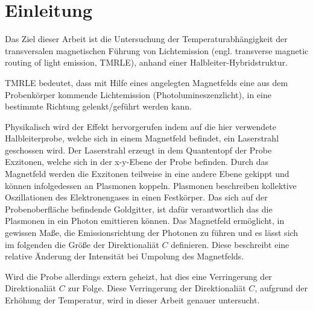 \chapter{Einleitung}
Das Ziel dieser Arbeit ist die Untersuchung der Temperaturabhängigkeit
der transversalen magnetischen Führung von Lichtemission (engl.
transverse magnetic routing of light emission, TMRLE), anhand einer Halbleiter-Hybridstruktur.

TMRLE bedeutet, dass mit Hilfe eines angelegten Magnetfelds eine aus dem 
Probenkörper kommende Lichtemission (Photolumineszenzlicht), in
eine bestimmte Richtung gelenkt/geführt werden kann.

Physikalisch wird der Effekt hervorgerufen indem auf die hier verwendete 
Halbleiterprobe, welche sich in einem Magnetfeld befindet, ein Laserstrahl geschossen wird.
Der Laserstrahl erzeugt in dem Quantentopf der Probe Exzitonen, welche sich in der x-y-Ebene der
Probe befinden. Durch das Magnetfeld werden die Exzitonen teilweise in eine andere Ebene gekippt und
können infolgedessen an Plasmonen koppeln.
Plasmonen beschreiben kollektive Oszillationen des Elektronengases in einen Festkörper. 
Das sich auf der Probenoberfläche befindende Goldgitter, ist dafür verantwortlich 
das die Plasmonen in ein Photon emittieren können.
Das Magnetfeld ermöglicht, in gewissen Maße, die Emissionsrichtung der Photonen 
zu führen und es lässt sich im folgenden die Größe der
Direktionaliät $C$ definieren. 
Diese beschreibt eine relative Änderung der Intensität bei Umpolung des Magnetfelds.

Wird die Probe allerdings extern geheizt, hat dies eine Verringerung  der Direktionaliät $C$
zur Folge. 
Diese Verringerung der Direktionaliät $C$, aufgrund der Erhöhung der Temperatur, wird in dieser Arbeit genauer untersucht.